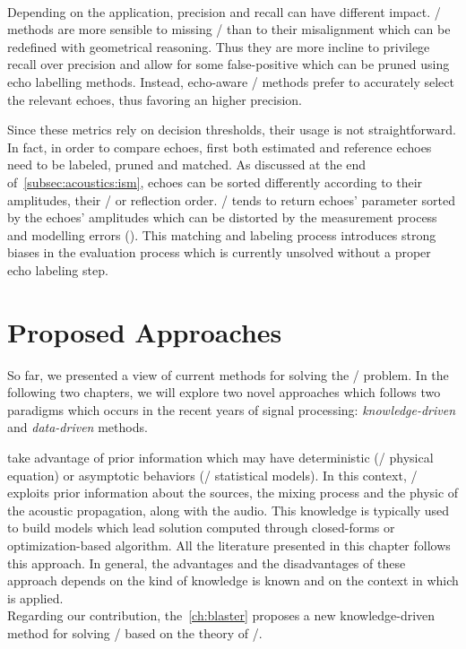 \begin{itemize}
    \\Depending on the application, precision and recall can have different impact.
    \RooGE/ methods are more sensible to missing \TOAs/ than to their misalignment which can be redefined with geometrical reasoning.
    Thus they are more incline to privilege recall over precision and allow for some false-positive which can be pruned using echo labelling methods.
    Instead, echo-aware \SE/ methods prefer to accurately select the relevant echoes, thus favoring an higher precision.
\end{itemize}

\mynewline
Since these metrics rely on decision thresholds, their usage is not straightforward.
In fact, in order to compare echoes, first both estimated and reference echoes need to be labeled, pruned and matched.
As discussed at the end of~\cref{subsec:acoustics:ism}, echoes can be sorted differently according to their amplitudes, their \TOAs/ or reflection order.
\AER/ tends to return echoes' parameter sorted by the echoes' amplitudes which can be distorted by the measurement process and modelling errors ().
This matching and labeling process introduces strong biases in the evaluation process which is currently unsolved without a proper echo labeling step.

\section{Proposed Approaches}
So far, we presented a view of current methods for solving the \AER/ problem.
In the following two chapters, we will explore two novel approaches which follows two paradigms which occurs in the recent years of signal processing:
\textit{knowledge-driven} and \textit{data-driven} methods.

 take advantage of prior information which may have deterministic (\eg/ physical equation) or asymptotic behaviors (\eg/ statistical models).
In this context, \AER/ exploits prior information about the sources, the mixing process and the physic of the acoustic propagation, along with the audio.
This knowledge is typically used to build models which lead solution computed through closed-forms or optimization-based algorithm.
All the literature presented in this chapter follows this approach.
In general, the advantages and the disadvantages of these approach depends on the kind of knowledge is known and on the context in which is applied.
\\Regarding our contribution, the~\cref{ch:blaster} proposes a new knowledge-driven method for solving \AER/ based on the theory of \CDdef/.

